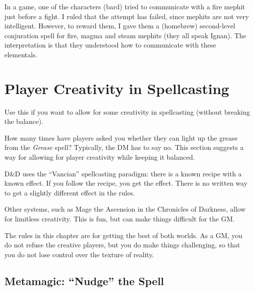 \documentclass[twocolumn]{dndbook}
\begin{document}
In a game, one of the characters (bard) tried to communicate with a fire mephit just before a fight.
I ruled that the attempt has failed, since mephits are not very intelligent.
However, to reward them, I gave them a (homebrew) second-level conjuration spell for fire, magma and steam mephits (they all speak Ignan).
The interpretation is that they understood how to communicate with these elementals.\par

\section{Player Creativity in Spellcasting}


\begin{emphasisParagraph}
	Use this if you want to allow for some creativity in spellcasting (without breaking the balance).
\end{emphasisParagraph}

\begin{emphasisParagraph}
	How many times have players asked you whether they can light up the grease from the \emph{Grease} spell?
	Typically, the DM has to say no. This section suggests a way for allowing for player creativity while keeping it balanced.
\end{emphasisParagraph}

D\&D uses the ``Vancian'' spellcasting paradigm: there is a known recipe with a known effect.
If you follow the recipe, you get the effect.
There is no written way to get a slightly different effect in the rules.\par

Other systems, such as Mage the Ascension in the Chronicles of Darkness, allow for limitless creativity.
This is fun, but can make things difficult for the GM.\par

The rules in this chapter are for getting the best of both worlds.
As a GM, you do not refuse the creative players, but you do make things challenging, so that you do not lose control over the texture of reality.

\subsection{Metamagic: ``Nudge'' the Spell}
\end{document}
